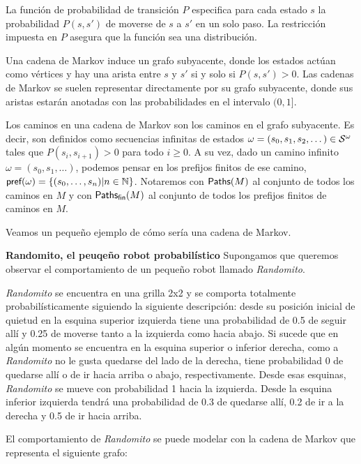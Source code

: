 La función de probabilidad de transición $P$ especifica para cada estado $s$ la
probabilidad $P(s, s')$ de moverse de $s$ a $s'$ en un solo paso. La
restricción impuesta en $P$ asegura que la función sea una distribución.

Una cadena de Markov induce un grafo subyacente, donde los estados actúan como
vértices y hay una arista entre $s$ y $s'$ si y solo si $P(s, s') > 0$. Las
cadenas de Markov se suelen representar directamente por su grafo subyacente,
donde sus aristas estarán anotadas con las probabilidades en el intervalo $(0,
	1]$.

Los caminos en una cadena de Markov son los caminos en el grafo subyacente. Es
decir, son definidos como secuencias infinitas de estados $\omega = (s_0, s_1,
	s_2, \dots) \in \mathcal{S}^\omega$ tales que $P(s_i, s_{i+1}) > 0 $ para todo $i \geq
	0$. A su vez, dado un camino infinito $\omega = (s_0, s_1, \dots)$, podemos
pensar en los prefijos finitos de ese camino, $\textsf{pref}(\omega) = \{(s_0,
	\dots, s_n) | n \in \mathbb{N}\}$. Notaremos con $\textsf{Paths}(M)$ al conjunto de
todos los caminos en $M$ y con $\textsf{Paths}_\textsf{fin}(M)$ al conjunto de todos los prefijos
finitos de caminos en $M$.

Veamos un pequeño ejemplo de cómo sería una cadena de Markov.

\textbf{Randomito, el peuqeño robot probabilístico}
Supongamos que queremos observar el comportamiento de un pequeño robot llamado \textit{Randomito}.

\textit{Randomito} se encuentra en una grilla 2x2 y se comporta totalmente probabilísticamente siguiendo la siguiente descripción: desde su posición inicial de quietud en la esquina superior izquierda tiene una probabilidad de 0.5 de seguir allí y 0.25 de moverse tanto a la izquierda como hacia abajo. Si sucede que en algún momento se encuentra en la esquina superior o inferior derecha, como a \emph{Randomito} no le gusta quedarse del lado de la derecha, tiene probabilidad 0 de quedarse allí o de ir hacia arriba o abajo, respectivamente. Desde esas esquinas, \emph{Randomito} se mueve con probabilidad 1 hacia la izquierda. Desde la esquina inferior izquierda tendrá una probabilidad de 0.3 de quedarse allí, 0.2 de ir a la derecha y 0.5 de ir hacia arriba.

El comportamiento de \emph{Randomito} se puede modelar con la cadena de Markov
que representa el siguiente grafo:

